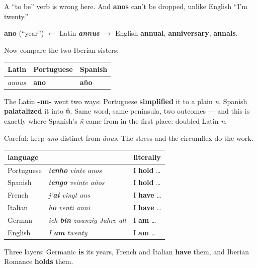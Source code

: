 A \textquotedblleft{}to be\textquotedblright{} verb is wrong here. And \textbf{anos} can't be dropped, unlike English \textquotedblleft{}I'm twenty.\textquotedblright{}

\begin{cousinweb}
\textbf{ano} (\textquotedblleft{}year\textquotedblright{}) $\leftarrow$ Latin \emph{\textbf{annus}} $\to$ English \textbf{annual}, \textbf{anniversary}, \textbf{annals}.

Now compare the two Iberian sisters:

\noindent
\begin{tabularx}{\linewidth}{@{}>{\raggedright\arraybackslash}X>{\raggedright\arraybackslash}X>{\raggedright\arraybackslash}X@{}}
\toprule
\textbf{Latin} & \textbf{Portuguese} & \textbf{Spanish} \\
\midrule
\emph{annus} & \textbf{ano} & \textbf{año} \\
\bottomrule
\end{tabularx}

The Latin \textbf{-nn-} went two ways: Portuguese \textbf{simplified} it to a plain \emph{n}, Spanish \textbf{palatalized} it into \textbf{ñ}. Same word, same peninsula, two outcomes — and this is exactly where Spanish's \emph{ñ} came from in the first place: doubled Latin \emph{n}.

Careful: keep \emph{ano} distinct from \emph{ânus}. The stress and the circumflex do the work.
\end{cousinweb}

\begin{grammarlens}[title={Grammar Lens: Who has, who is}]
\noindent
\begin{tabularx}{\linewidth}{@{}>{\raggedright\arraybackslash}X>{\raggedright\arraybackslash}X>{\raggedright\arraybackslash}X@{}}
\toprule
\textbf{language} & \textbf{} & \textbf{literally} \\
\midrule
Portuguese & \emph{t\textbf{enho} vinte anos} & I \textbf{hold} … \\
Spanish & \emph{t\textbf{engo} veinte años} & I \textbf{hold} … \\
French & \emph{j'\textbf{ai} vingt ans} & I \textbf{have} … \\
Italian & \emph{h\textbf{o} venti anni} & I \textbf{have} … \\
German & \emph{ich \textbf{bin} zwanzig Jahre alt} & I \textbf{am} … \\
English & \emph{I \textbf{am} twenty} & I \textbf{am} … \\
\bottomrule
\end{tabularx}

Three layers: Germanic \textbf{is} its years, French and Italian \textbf{have} them, and Iberian Romance \textbf{holds} them.
\end{grammarlens}

